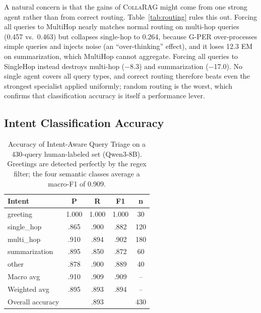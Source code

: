 \documentclass[11pt,a4paper]{article}
\newcommand{\sys}{\textsc{CollaRAG}}
\begin{document}
A natural concern is that the gains of \sys{} might come from one strong agent rather than from correct routing.
Table~\ref{tab:routing} rules this out.
Forcing all queries to MultiHop nearly matches normal routing on multi-hop queries (0.457 vs.\ 0.463) but collapses single-hop to 0.264, because G-PER over-processes simple queries and injects noise (an ``over-thinking'' effect), and it loses 12.3 EM on summarization, which MultiHop cannot aggregate.
Forcing all queries to SingleHop instead destroys multi-hop ($-$8.3) and summarization ($-$17.0).
No single agent covers all query types, and correct routing therefore beats even the strongest specialist applied uniformly; random routing is the worst, which confirms that classification accuracy is itself a performance lever.

\subsection{Intent Classification Accuracy}
\label{sec:analysis:intent}

\begin{table}[t]
\centering
\small
\setlength{\tabcolsep}{6pt}
\begin{tabular}{@{}l|ccc|c@{}}
\toprule
\textbf{Intent} & \textbf{P} & \textbf{R} & \textbf{F1} & \textbf{n} \\
\midrule
greeting        & 1.000 & 1.000 & 1.000 & 30 \\
single\_hop     & .865 & .900 & .882 & 120 \\
multi\_hop      & .910 & .894 & .902 & 180 \\
summarization   & .895 & .850 & .872 & 60 \\
other           & .878 & .900 & .889 & 40 \\
\midrule
Macro avg       & .910 & .909 & .909 & -- \\
Weighted avg    & .895 & .893 & .894 & -- \\
\midrule
Overall accuracy & \multicolumn{3}{c|}{.893} & 430 \\
\bottomrule
\end{tabular}
\caption{Accuracy of Intent-Aware Query Triage on a 430-query human-labeled set (Qwen3-8B). Greetings are detected perfectly by the regex filter; the four semantic classes average a macro-F1 of 0.909.}
\label{tab:intent}
\end{table}
\end{document}
